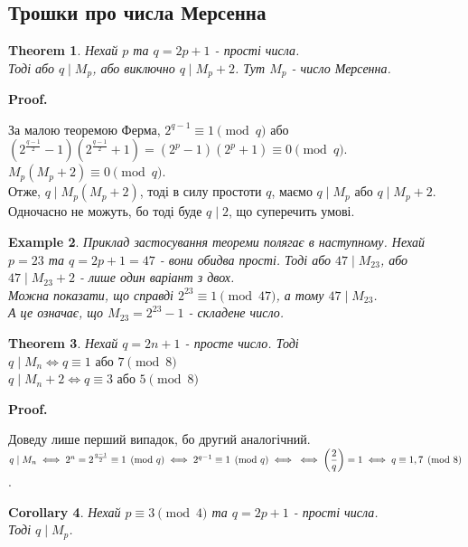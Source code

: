 \documentclass[a4paper, 10pt]{article}
\makeatletter
\theoremstyle{theoremdd}
\newtheorem{theorem}{Theorem}[subsection]
\theoremstyle{theoremdd}
\theoremstyle{theoremdd}
\theoremstyle{theoremdd}
\newtheorem{example}[theorem]{Example}
\theoremstyle{theoremdd}
\theoremstyle{theoremdd}
\theoremstyle{theoremdd}
\theoremstyle{theoremdd}
\newtheorem{corollary}[theorem]{Corollary}
\renewenvironment{proof}[1][Proof.\\]{\par
\pushQED{\hfill \qed}%
\normalfont \topsep6\p@\@plus6\p@\relax
\trivlist
\item\relax
{\bfseries
#1\@addpunct{.}}\hspace\labelsep\ignorespaces
}{%
\popQED\endtrivlist\@endpefalse
}
\makeatother
\begin{document}
\subsection{Трошки про числа Мерсенна}
\begin{theorem}
Нехай $p$ та $q = 2p+1$ - прості числа.\\
Тоді або $q \mid M_p$, або виключно $q \mid M_p+2$. Тут $M_p$ - число Мерсенна.
\end{theorem}

\begin{proof}
За малою теоремою Ферма, $2^{q-1} \equiv 1 \pmod q$ або\\
$(2^{\frac{q-1}{2}}-1)(2^{\frac{q-1}{2}}+1) = (2^p-1)(2^p+1) \equiv 0 \pmod q$.\\
$M_p(M_p+2) \equiv 0 \pmod q$.\\
Отже, $q \mid M_p(M_p+2)$, тоді в силу простоти $q$, маємо $q \mid M_p$ або $q \mid M_p+2$.\\
Одночасно не можуть, бо тоді буде $q \mid 2$, що суперечить умові.
\end{proof}

\begin{example}
Приклад застосування теореми полягає в наступному. Нехай $p = 23$ та $q = 2p+1 = 47$ - вони обидва прості. Тоді або $47 \mid M_{23}$, або $47 \mid M_{23}+2$ - лише один варіант з двох.\\
Можна показати, що справді $2^{23} \equiv 1 \pmod {47}$, а тому $47 \mid M_{23}$.\\
А це означає, що $M_{23} = 2^{23} - 1$ - складене число.
\end{example}

\begin{theorem}
Нехай $q = 2n+1$ - просте число. Тоді\\
$q \mid M_n \iff q \equiv 1 \text{ або } 7 \pmod 8$\\
$q \mid M_n+2 \iff q \equiv 3 \text{ або } 5 \pmod 8$
\end{theorem}

\begin{proof}
Доведу лише перший випадок, бо другий аналогічний.\\
$q \mid M_n \iff 2^n = 2^{\frac{q-1}{2}} \equiv 1 \pmod q \iff 2^{q-1} \equiv 1 \pmod q \iff \\ \iff \left( \dfrac{2}{q} \right) = 1 \iff q \equiv 1,7 \pmod 8$.
\end{proof}

\begin{corollary}
Нехай $p \equiv 3 \pmod 4$ та $q = 2p+1$ - прості числа.\\
Тоді $q \mid M_p$.
\end{corollary}
\end{document}
